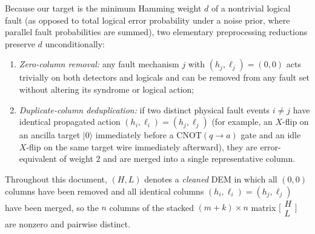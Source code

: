 \documentclass[12pt]{article}
\theoremstyle{definition}
\begin{document}
Because our target is the minimum Hamming weight $d$ of a nontrivial logical fault (as opposed to total logical
error probability under a noise prior, where parallel fault probabilities are summed), two elementary preprocessing
reductions preserve $d$ unconditionally:
\begin{enumerate}[label=(\arabic*)]
  \item \emph{Zero-column removal:} any fault mechanism $j$ with $(h_j, \ell_j) = (0, 0)$ acts trivially on both
    detectors and logicals and can be removed from any fault set without altering its syndrome or logical action;
  \item \emph{Duplicate-column deduplication:} if two distinct physical fault events $i \neq j$ have identical
    propagated action $(h_i, \ell_i) = (h_j, \ell_j)$ (for example, an $X$-flip on an ancilla target $|0\rangle$
    immediately before a $\mathrm{CNOT}(q \to a)$ gate and an idle $X$-flip on the same target wire immediately
    afterward), they are error-equivalent of weight $2$ and are merged into a single representative column.
\end{enumerate}
Throughout this document, $(H, L)$ denotes a \emph{cleaned} DEM in which all $(0, 0)$ columns have been removed
and all identical columns $(h_i, \ell_i) = (h_j, \ell_j)$ have been merged, so the $n$ columns of the stacked $(m
+ k) \times n$ matrix $\bigl[\begin{smallmatrix} H \\ L \end{smallmatrix}\bigr]$ are nonzero and pairwise
distinct.
\end{document}
